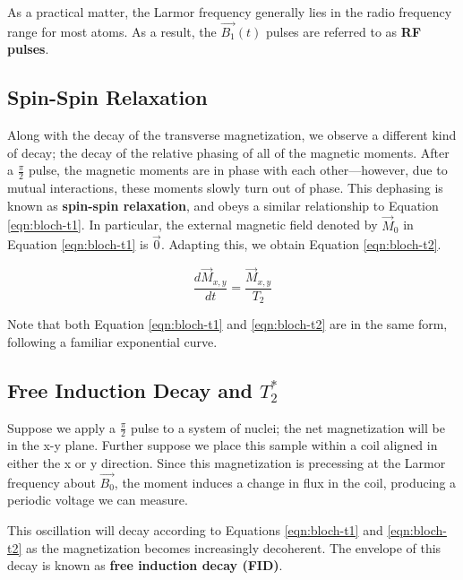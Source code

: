 \documentclass[
    floatfix,  %
    reprint,
    amsmath,
    amssymb,
    aps,
]{revtex4-2}
\newcommand{\halfpi}{\frac{\pi}{2}}
\begin{document}
As a practical matter, the Larmor frequency generally lies in the radio frequency range for most atoms. As a result, the $\vec{B_1}(t)$ pulses are referred to as \textbf{RF pulses}.







\subsection{\label{sec:t2} Spin-Spin Relaxation}

Along with the decay of the transverse magnetization, we observe a different kind of decay; the decay of the relative phasing of all of the magnetic moments. After a $\halfpi$ pulse, the magnetic moments are in phase with each other---however, due to mutual interactions, these moments slowly turn out of phase. This dephasing is known as \textbf{spin-spin relaxation}, and obeys a similar relationship to Equation \ref{eqn:bloch-t1}. In particular, the external magnetic field denoted by $\vec{M}_0$ in Equation \ref{eqn:bloch-t1} is $\vec{0}$. Adapting this, we obtain Equation \ref{eqn:bloch-t2}.

\begin{equation}\label{eqn:bloch-t2}
    \frac{d\vec{M}_{x,y}}{dt} = \frac{\vec{M}_{x,y}}{T_2}
\end{equation}

Note that both Equation \ref{eqn:bloch-t1} and \ref{eqn:bloch-t2} are in the same form, following a familiar exponential curve.





\subsection{Free Induction Decay and $T_2^*$}

Suppose we apply a $\halfpi$ pulse to a system of nuclei; the net magnetization will be in the x-y plane. Further suppose we place this sample within a coil aligned in either the x or y direction. Since this magnetization is precessing at the Larmor frequency about \(\vec{B_0}\), the moment induces a change in flux in the coil, producing a periodic voltage we can measure.

This oscillation will decay according to Equations \ref{eqn:bloch-t1} and \ref{eqn:bloch-t2} as the magnetization becomes increasingly decoherent. The envelope of this decay is known as \textbf{free induction decay (FID)}.
\end{document}
